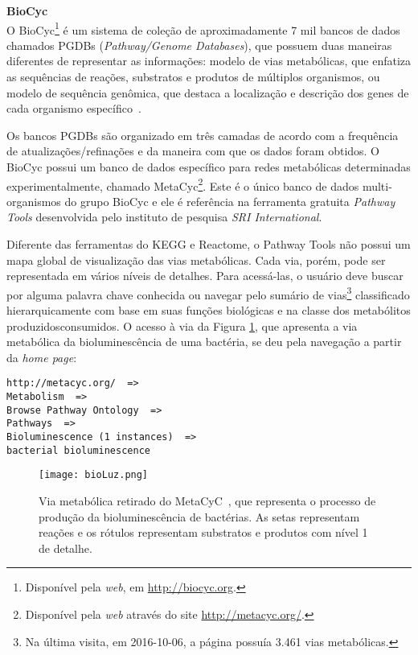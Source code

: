\break


\textbf{BioCyc} \\

\indent O BioCyc\footnote{Disponível pela \textit{web}, em \url{http://biocyc.org}.} é um sistema de coleção de aproximadamente 7 mil bancos de dados chamados PGDBs (\textit{Pathway/Genome Databases}), que possuem duas maneiras diferentes de representar as informações: modelo de vias metabólicas, que enfatiza as sequências de reações, substratos e produtos de múltiplos organismos, ou modelo de sequência genômica, que destaca a localização e descrição dos genes de cada organismo específico~\cite{biocycIntro}. 

\indent Os bancos PGDBs são organizado em três camadas de acordo com a frequência de atualizações/refinações e da maneira com que os dados foram obtidos. O BioCyc possui um banco de dados específico para redes metabólicas determinadas experimentalmente, chamado MetaCyc\footnote{Disponível pela \textit{web} através do site \url{http://metacyc.org/}.}. Este é o único banco de dados multi-organismos do grupo BioCyc e ele é referência na ferramenta gratuita \textit{Pathway Tools} desenvolvida pelo instituto de pesquisa \textit{SRI International}.

\indent Diferente das ferramentas do KEGG e Reactome, o Pathway  Tools não possui um mapa global de visualização das vias metabólicas. Cada via, porém, pode ser representada em vários níveis de detalhes. Para acessá-las, o usuário deve buscar por alguma palavra chave conhecida ou navegar pelo sumário de vias\footnote{Na última visita, em 2016-10-06, a página possuía 3.461 vias metabólicas.} classificado hierarquicamente com base em suas funções biológicas e na classe dos metabólitos produzidos\/consumidos. O acesso à via da Figura \ref{fig:bioLuz}, que apresenta a via metabólica da bioluminescência de uma bactéria, se deu pela navegação a partir da \textit{home page}:

\begin{lstlisting} 
http://metacyc.org/  =>
Metabolism  =>
Browse Pathway Ontology  =>
Pathways  =>
Bioluminescence (1 instances)  =>
bacterial bioluminescence
\end{lstlisting}

\begin{figure}[h]
    \centering
    \texttt{[image: bioLuz.png]}
    \caption{Via metabólica retirado do MetaCyC~\cite{examplePathway}, que representa o processo de produção da bioluminescência de bactérias. As setas representam reações e os rótulos representam substratos e produtos com nível 1 de detalhe.}
    \label{fig:bioLuz}
\end{figure}

